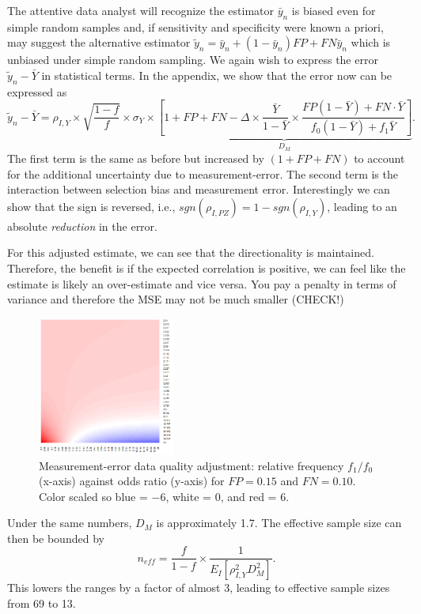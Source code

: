 \documentclass[11pt]{article}
\numberwithin{equation}{section}
\theoremstyle{plain}
\begin{document}
The attentive data analyst will recognize the estimator $\bar y_n$ is biased even for simple random samples and, if sensitivity and specificity were known a priori, may suggest the alternative estimator $\tilde y_n = \bar y_n + (1-\bar y_n) FP + FN \bar y_n$ which is unbiased under simple random sampling. We again wish to express the error $\tilde  y_n - \bar Y$ in statistical terms. In the appendix, we show that the error now can be expressed as
$$
\tilde y_n - \bar Y = \rho_{I,Y} \times \sqrt{\frac{1-f}{f}} \times \sigma_{Y}
\times \underbrace{\left[ 1 + FP + FN - \Delta \times \frac{\bar Y}{1-\bar Y} \times \frac{FP(1-\bar Y) + FN \cdot \bar Y}{f_0 (1-\bar Y) + f_1 \bar Y} \right]}_{D_M}.
$$
The first term is the same as before but increased by $(1 + FP + FN)$ to account for the additional uncertainty due to measurement-error.  The second term is the interaction between selection bias and measurement error.  Interestingly we can show that the sign is reversed, i.e., $sgn(\rho_{I,PZ}) = 1 - sgn(\rho_{I,Y})$, leading to an absolute \emph{reduction} in the error.

For this adjusted estimate, we can see that the directionality is maintained.  Therefore, the benefit is if the expected correlation is positive, we can feel like the estimate is likely an over-estimate and vice versa.  You pay a penalty in terms of variance and therefore the MSE may not be much smaller (CHECK!)

\begin{figure}
\centering
\includegraphics[width = 0.4\textwidth]{../methods/figs/mem_heatmap_article.png}
\caption{Measurement-error data quality adjustment: relative frequency $f_1/f_0$ (x-axis) against odds ratio (y-axis) for $FP=0.15$ and $FN=0.10$. Color scaled so blue = $-6$, white = 0, and red = $6$.}
\vspace{-0.7cm}
\end{figure}

Under the same numbers, $D_M$ is approximately 1.7.  The effective sample size can then be bounded by
$$
n_{eff} = \frac{f}{1-f} \times \frac{1}{E_{I} \left[ \rho_{I,Y}^2 D_M^2 \right]}.
$$
This lowers the ranges by a factor of almost $3$, leading to effective sample sizes from 69 to 13.
\end{document}
